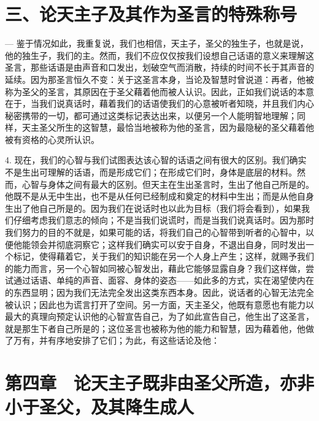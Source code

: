 \section{三、论天主子及其作为圣言的特殊称号}

— 鉴于情况如此，我重复说，我们也相信，天主子，圣父的独生子，也就是说，他的独生子，我们的主。然而，我们不应仅仅按我们设想自己话语的意义来理解这圣言，那些话语是由声音和口发出，划破空气而消散，持续的时间不长于其声音的延续。因为那圣言恒久不变：关于这圣言本身，当论及智慧时曾说道：再者，他被称为圣父的圣言，其原因在于圣父藉着他而被人认识。因此，正如我们说话的本意在于，当我们说真话时，藉着我们的话语使我们的心意被听者知晓，并且我们内心秘密携带的一切，都可通过这类标记表达出来，以便另一个人能明智地理解；同样，天主圣父所生的这智慧，最恰当地被称为他的圣言，因为最隐秘的圣父藉着他被有资格的心灵所认识。\par

4. 现在，我们的心智与我们试图表达该心智的话语之间有很大的区别。我们确实不是生出可理解的话语，而是形成它们；在形成它们时，身体是底层的材料。然而，心智与身体之间有最大的区别。但天主在生出圣言时，生出了他自己所是的。他既不是从无中生出，也不是从任何已经制成和奠定的材料中生出；而是从他自身生出了他自己所是的。因为我们在说话时也以此为目标（我们将会看到），如果我们仔细考虑我们意志的倾向；不是当我们说谎时，而是当我们说真话时。因为那时我们努力的目的不就是，如果可能的话，将我们自己的心智带到听者的心智中，以便他能领会并彻底洞察它；这样我们确实可以安于自身，不退出自身，同时发出一个标记，使得藉着它，关于我们的知识能在另一个人身上产生；这样，就赐予我们的能力而言，另一个心智如同被心智发出，藉此它能够显露自身？我们这样做，尝试通过话语、单纯的声音、面容、身体的姿态——如此多的方式，实在渴望使内在的东西显明；因为我们无法完全发出这类东西本身。因此，说话者的心智无法完全被认识；因此也为谎言打开了空间。另一方面，天主圣父，他既有意愿也有能力以最大的真理向预定认识他的心智宣告自己，为了如此宣告自己，他生出了这圣言，就是那生下者自己所是的；这位圣言也被称为他的能力和智慧，因为藉着他，他做了万有，并有序地安排了它们；为此，有这些话论及他：\par


\section{第四章　论天主子既非由圣父所造，亦非小于圣父，及其降生成人}

